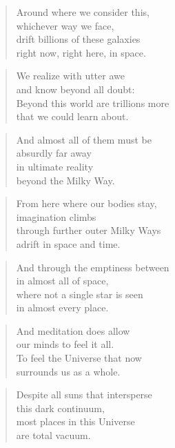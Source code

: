\documentclass[10pt,a4paper]{article}
\begin{document}
\begin{paracol}{2}
\begin{verse}
Around where we consider this,\\
whichever way we face,\\
drift billions of these galaxies\\
right now, right here, in space.
\end{verse}

\begin{verse}
We realize with utter awe\\
and know beyond all doubt:\\
Beyond this world are trillions more\\
that we could learn about.
\end{verse}

\begin{verse}
And almost all of them must be\\
absurdly far away\\
in ultimate reality\\
beyond the Milky Way.
\end{verse}

\begin{verse}
From here where our bodies stay,\\
imagination climbs\\
through further outer Milky Ways\\
adrift in space and time.
\end{verse}

\begin{verse}
And through the emptiness between\\
in almost all of space,\\
where not a single star is seen\\
in almost every place.
\end{verse}

\begin{verse}
And meditation does allow\\
our minds to feel it all.\\
To feel the Universe that now\\
surrounds us as a whole.
\end{verse}

\begin{verse}
Despite all suns that intersperse\\
this dark continuum,\\
most places in this Universe\\
are total vacuum.
\end{verse}


\end{paracol}
\end{document}
